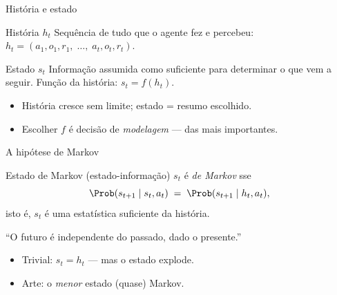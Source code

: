 \documentclass[aspectratio=169, 11pt]{beamer}
\begin{document}
\begin{frame}{História e estado}
  \begin{defbox}{História $h_t$}
    Sequência de tudo que o agente fez e percebeu:
    $h_t = (a_1, o_1, r_1,\; \ldots,\; a_t, o_t, r_t)$.
  \end{defbox}

  \begin{defbox}{Estado $s_t$}
    Informação assumida como suficiente para determinar o que vem a seguir.
    Função da história: $s_t = f(h_t)$.
  \end{defbox}

  \begin{itemize}
    \item História cresce sem limite; estado = \alert{resumo} escolhido.
    \item Escolher $f$ é decisão de \emph{modelagem} — das mais importantes.
  \end{itemize}
\end{frame}

\begin{frame}{A hipótese de Markov}
  \begin{defbox}{Estado de Markov (estado-informação)}
    $s_t$ é \emph{de Markov} sse
    \[
      \Prob(s_{t+1} \mid s_t, a_t) \;=\; \Prob(s_{t+1} \mid h_t, a_t),
    \]
    isto é, $s_t$ é uma \alert{estatística suficiente} da história.
  \end{defbox}

  \begin{ideiabox}
    ``O futuro é independente do passado, dado o presente.''
  \end{ideiabox}

  \begin{itemize}
    \item Trivial: $s_t = h_t$ — mas o estado explode.
    \item Arte: o \emph{menor} estado (quase) Markov.
  \end{itemize}
\end{frame}
\end{document}
